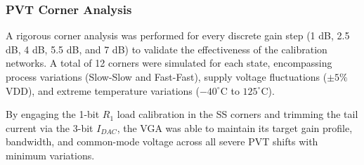 \subsubsection*{PVT Corner Analysis}
A rigorous corner analysis was performed for every discrete gain step (1 dB, 2.5 dB, 4 dB, 5.5 dB, and 7 dB) to validate the effectiveness of 
the calibration networks. A total of 12 corners were simulated for each state, encompassing process variations (Slow-Slow and Fast-Fast), 
supply voltage fluctuations ($\pm 5\%$ VDD), and extreme temperature variations ($-40^\circ\text{C}$ to $125^\circ\text{C}$). 

By engaging the 1-bit $R_1$ load calibration in the SS corners and trimming the tail current via the 3-bit $I_{DAC}$, the VGA was able to maintain its target gain profile, bandwidth, and common-mode voltage across all severe PVT shifts with minimum variations.

